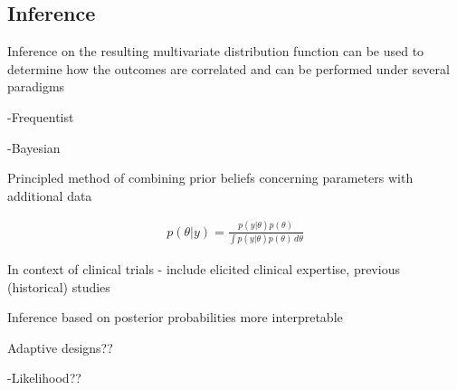 \subsection*{Inference}

Inference on the resulting multivariate distribution function can be used to determine how the outcomes are correlated and can be performed under several paradigms 

-Frequentist

-Bayesian

Principled method of combining prior beliefs concerning parameters with additional data

\begin{gather}
p(\theta|y)=\frac{p(y|\theta)p(\theta)}{\int p(y|\theta)p(\theta)\,d\theta}
\end{gather}

In context of clinical trials - include elicited clinical expertise, previous (historical) studies

Inference based on posterior probabilities more interpretable

Adaptive designs??

-Likelihood??




